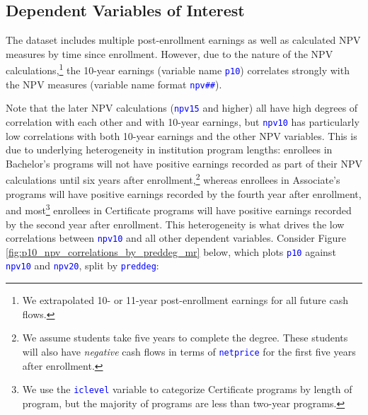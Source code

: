\documentclass[12pt]{article}
\numberwithin{equation}{section}
\newcommand{\Varnm}[1]{\texttt{\textcolor{Blue}{#1}}}
\begin{document}
\subsection{Dependent Variables of Interest}
The dataset includes multiple post-enrollment earnings as well as calculated NPV measures by time since enrollment. However, due to the nature of the NPV calculations,\footnote{We extrapolated 10- or 11-year post-enrollment earnings for all future cash flows.} the 10-year earnings (variable name \Varnm{p10}) correlates strongly with the NPV measures (variable name format \Varnm{npv\#\#}).


Note that the later NPV calculations (\Varnm{npv15} and higher) all have high degrees of correlation with each other and with 10-year earnings, but \Varnm{npv10} has particularly low correlations with both 10-year earnings and the other NPV variables. This is due to underlying heterogeneity in institution program lengths: enrollees in Bachelor's programs will not have positive earnings recorded as part of their NPV calculations until six years after enrollment,\footnote{We assume students take five years to complete the degree. These students will also have \textit{negative} cash flows in terms of \Varnm{netprice} for the first five years after enrollment.} whereas enrollees in Associate's programs will have positive earnings recorded by the fourth year after enrollment, and most\footnote{We use the \Varnm{iclevel} variable to categorize Certificate programs by length of program, but the majority of programs are less than two-year programs.} enrollees in Certificate programs will have positive earnings recorded by the second year after enrollment. This heterogeneity is what drives the low correlations between \Varnm{npv10} and all other dependent variables. Consider Figure \ref{fig:p10_npv_correlations_by_preddeg_mr} below, which plots \Varnm{p10} against \Varnm{npv10} and \Varnm{npv20}, split by \Varnm{preddeg}:
\end{document}
